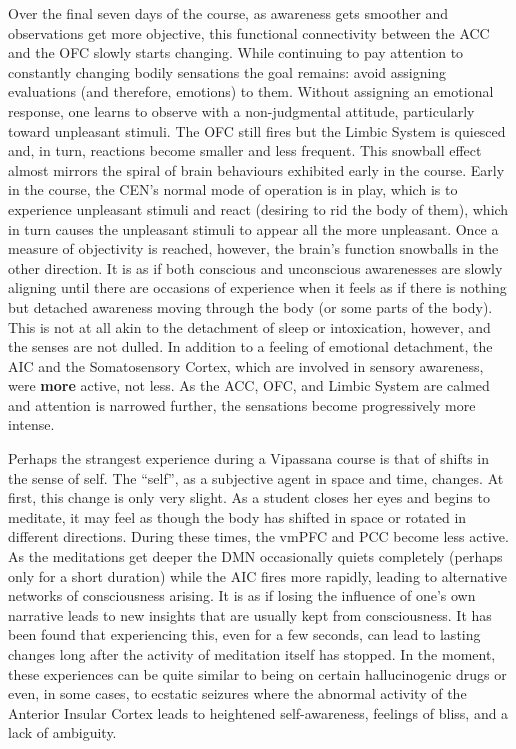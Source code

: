 \documentclass[a4paper, amsfonts, amssymb, amsmath, reprint, showkeys, nofootinbib, twoside]{revtex4-1}
\begin{document}
Over the final seven days of the course, as awareness gets smoother and observations get more objective, this
functional connectivity between the ACC and the OFC slowly starts changing. While
continuing to pay attention to constantly changing bodily sensations the goal remains: avoid
assigning evaluations (and therefore, emotions) to them. Without assigning an
emotional response, one learns to observe with a
non-judgmental attitude, particularly toward unpleasant stimuli. The OFC still fires
but the Limbic System is quiesced and, in turn, reactions become smaller and less
frequent. This snowball effect almost mirrors the spiral of brain behaviours
exhibited early in the course. Early in the course, the CEN's normal mode of
operation is in play, which is to experience unpleasant stimuli and react (desiring to rid the body of
them), which in turn causes the unpleasant stimuli to appear all the more
unpleasant. Once a measure of objectivity is reached, however, the brain's function
snowballs in the other direction. It is as if both conscious and unconscious awarenesses are slowly aligning
until there are occasions of experience when it feels as if there is nothing but detached awareness moving
through the body (or some parts of the body). This is not at all akin to the
detachment of sleep or intoxication, however, and the senses are not dulled. In
addition to a feeling of emotional detachment, the AIC and the Somatosensory
Cortex, which are involved in sensory awareness, were \textbf{more} active, not
less. As the ACC, OFC, and Limbic System are calmed and attention is narrowed
further, the sensations become progressively more intense.

Perhaps the strangest experience during a Vipassana course is that of shifts in the
sense of self. The ``self'', as a subjective agent in space and time, changes. At
first, this change is only very slight. As a student closes her eyes and begins to
meditate, it may feel as though
the body has shifted in space or rotated in different directions. During these times,
the vmPFC and PCC become less active.  As the meditations get deeper the DMN
occasionally quiets completely (perhaps only for a short duration) while the AIC
fires more rapidly, leading to alternative networks of consciousness
arising.  It is
as if losing the influence of one's own narrative leads to new insights that are
usually kept from consciousness. It has been found that experiencing this, even for a
few seconds, can lead to lasting changes long after the activity of meditation itself
has stopped. \cite{alteredtraits} In the moment, these experiences can be quite
similar to being on certain hallucinogenic drugs or even, in some cases, to ecstatic
seizures where the abnormal activity of the Anterior Insular Cortex leads to
heightened self-awareness, feelings of bliss, and a lack of ambiguity. \cite{cortexbliss}
\end{document}
